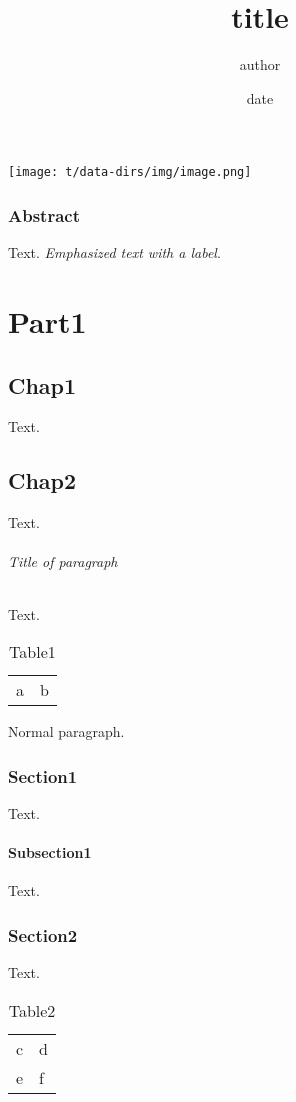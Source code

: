 \documentclass[a4paper,11pt]{book}
\title{title}
\author{author}
\date{date}
\begin{document}
\maketitle
\setcounter{tocdepth}{0}
\tableofcontents
\texttt{[image: t/data-dirs/img/image.png]}

\section*{Abstract}
\label{s:1}
Text.
\hypertarget{label1}{}\emph{Emphasized text with a label}.

\part{Part1}
\label{s:2}
\setcounter{tocdepth}{0}
\minitoc
\chapter{Chap1}
\label{s:3}
Text.

\chapter{Chap2}
\label{s:4}
\setcounter{tocdepth}{3}
\minitoc
Text.

\paragraph{Title of paragraph}
Text.
\begin{table}[htbp]
\begin{tabular}{ll}
a & b \\
\end{tabular}
\caption{Table1}
\label{tbl:1}
\end{table}

Normal paragraph.

\section{Section1}
\label{s:5}
Text.

\subsection{Subsection1}
\label{s:6}
Text.

\section{Section2}
\label{s:7}
Text.
\begin{table}[htbp]
\begin{tabular}{ll}
c & d \\
e & f \\
\end{tabular}
\caption{Table2}
\label{tbl:2}
\end{table}
\end{document}
